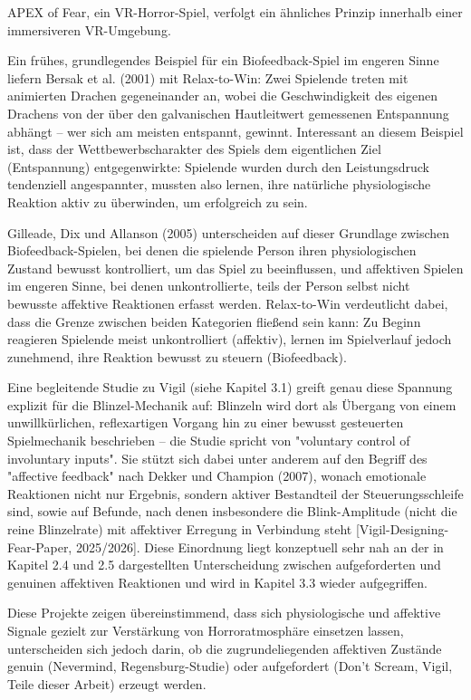 \documentclass[intern]{cgMA}
\begin{document}
APEX of Fear, ein VR-Horror-Spiel, verfolgt ein ähnliches Prinzip innerhalb einer immersiveren VR-Umgebung.

Ein frühes, grundlegendes Beispiel für ein Biofeedback-Spiel im engeren Sinne liefern Bersak et al. (2001) mit Relax-to-Win: Zwei Spielende treten mit animierten Drachen gegeneinander an, wobei die Geschwindigkeit des eigenen Drachens von der über den galvanischen Hautleitwert gemessenen Entspannung abhängt – wer sich am meisten entspannt, gewinnt. Interessant an diesem Beispiel ist, dass der Wettbewerbscharakter des Spiels dem eigentlichen Ziel (Entspannung) entgegenwirkte: Spielende wurden durch den Leistungsdruck tendenziell angespannter, mussten also lernen, ihre natürliche physiologische Reaktion aktiv zu überwinden, um erfolgreich zu sein.

Gilleade, Dix und Allanson (2005) unterscheiden auf dieser Grundlage zwischen Biofeedback-Spielen, bei denen die spielende Person ihren physiologischen Zustand bewusst kontrolliert, um das Spiel zu beeinflussen, und affektiven Spielen im engeren Sinne, bei denen unkontrollierte, teils der Person selbst nicht bewusste affektive Reaktionen erfasst werden. Relax-to-Win verdeutlicht dabei, dass die Grenze zwischen beiden Kategorien fließend sein kann: Zu Beginn reagieren Spielende meist unkontrolliert (affektiv), lernen im Spielverlauf jedoch zunehmend, ihre Reaktion bewusst zu steuern (Biofeedback).

Eine begleitende Studie zu Vigil (siehe Kapitel 3.1) greift genau diese Spannung explizit für die Blinzel-Mechanik auf: Blinzeln wird dort als Übergang von einem unwillkürlichen, reflexartigen Vorgang hin zu einer bewusst gesteuerten Spielmechanik beschrieben – die Studie spricht von "voluntary control of involuntary inputs". Sie stützt sich dabei unter anderem auf den Begriff des "affective feedback" nach Dekker und Champion (2007), wonach emotionale Reaktionen nicht nur Ergebnis, sondern aktiver Bestandteil der Steuerungsschleife sind, sowie auf Befunde, nach denen insbesondere die Blink-Amplitude (nicht die reine Blinzelrate) mit affektiver Erregung in Verbindung steht [Vigil-Designing-Fear-Paper, 2025/2026]. Diese Einordnung liegt konzeptuell sehr nah an der in Kapitel 2.4 und 2.5 dargestellten Unterscheidung zwischen aufgeforderten und genuinen affektiven Reaktionen und wird in Kapitel 3.3 wieder aufgegriffen.

Diese Projekte zeigen übereinstimmend, dass sich physiologische und affektive Signale gezielt zur Verstärkung von Horroratmosphäre einsetzen lassen, unterscheiden sich jedoch darin, ob die zugrundeliegenden affektiven Zustände genuin (Nevermind, Regensburg-Studie) oder aufgefordert (Don't Scream, Vigil, Teile dieser Arbeit) erzeugt werden.
\end{document}
